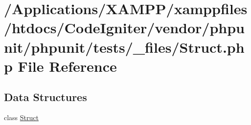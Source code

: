 \hypertarget{phpunit_2phpunit_2tests_2__files_2_struct_8php}{}\section{/\+Applications/\+X\+A\+M\+P\+P/xamppfiles/htdocs/\+Code\+Igniter/vendor/phpunit/phpunit/tests/\+\_\+files/\+Struct.php File Reference}
\label{phpunit_2phpunit_2tests_2__files_2_struct_8php}
\subsection*{Data Structures}
\begin{DoxyCompactItemize}
\item 
class \mbox{\hyperlink{class_struct}{Struct}}
\end{DoxyCompactItemize}
